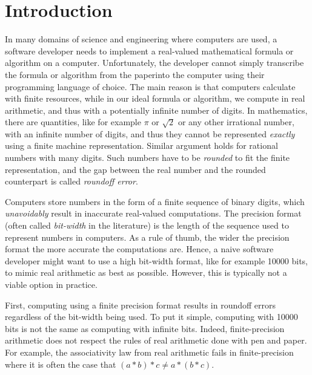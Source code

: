 
\chapter{Introduction}

\setupuuchapterbib
%
In many domains of science and engineering where computers are used, a software developer needs to implement a real-valued mathematical formula or algorithm on a computer.
%
Unfortunately, the developer cannot simply transcribe the formula or algorithm \textquotesingle\textquotesingle from the paper\textquotesingle\textquotesingle \space into the computer using their programming language of choice.
%
The main reason is that computers calculate with finite resources, while in our ideal formula or algorithm, we compute in real arithmetic, and thus with a potentially infinite number of digits.
%
In mathematics, there are quantities, like for example $\pi$ or $\sqrt{2}$ or any other irrational number, with an infinite number of digits, and thus they cannot be represented \emph{exactly} using a finite machine representation.
%
Similar argument holds for rational numbers with many digits. 
%
Such numbers have to be \emph{rounded} to fit the finite representation, and the gap between the real number and the rounded counterpart is called \emph{roundoff error}.
%

%
Computers store numbers in the form of a finite sequence of binary digits, which \emph{unavoidably} result in inaccurate real-valued computations.
%
The precision format (often called \emph{bit-width} in the literature) is the length of the sequence used to represent numbers in computers.
%
As a rule of thumb, the wider the precision format the more accurate the computations are.
%
Hence, a naive software developer might want to use a high bit-width format, like for example 10000 bits, to mimic real arithmetic as best as possible. 
%
However, this is typically not a viable option in practice.
%

First, computing using a finite precision format results in roundoff errors regardless of the bit-width being used.
%
To put it simple, computing with 10000 bits is not the same as computing with infinite bits.
%
Indeed, finite-precision arithmetic does not respect the rules of real arithmetic done with \textquotesingle \textquotesingle pen and paper\textquotesingle\textquotesingle.
%
For example, the associativity law from real arithmetic fails in finite-precision where it is often the case that $(a*b)*c \ne a*(b*c)$.

